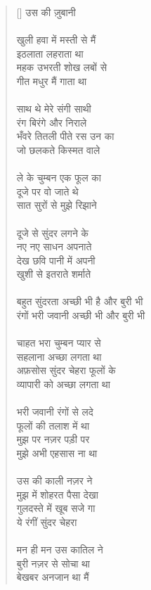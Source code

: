 \begin{verse}[\versewidth]\texthindi{
उस की ज़ुबानी\\
\\
खुली हवा में मस्ती से मैं \\
इठलाता लहराता था\\
महक उभरती शोख लबों से \\
गीत मधुर मैं गाता था\\
\\
साथ थे मेरे संगी साथी \\
रंग बिरंगे और निराले\\
भँवरे तितली पीते रस उन का \\
जो छलकते किस्मत वाले\\
\\
ले के चुम्बन एक फूल का\\
 दूजे पर वो जाते थे\\
सात सुरों से मुझे रिझाने \\
\\
दूजे से सुंदर लगने के \\
नए नए साधन अपनाते\\
देख छवि पानी में अपनी \\
खुशी से इतराते शर्माते\\
\\
बहुत सुंदरता अच्छी भी है और बुरी भी\\
रंगों भरी जवानी अच्छी भी और बुरी भी\\
\\
चाहत भरा चुम्बन प्यार से \\
सहलाना अच्छा लगता था\\
अफ़सोस सुंदर चेहरा फूलों के \\
व्यापारी को अच्छा लगता था\\
\\
भरी जवानी रंगों से लदे \\
फूलों की तलाश में था\\
मुझ पर नज़र पड़ी पर \\
मुझे अभी एहसास ना था\\
\\
उस की काली नज़र ने \\
मुझ में शोहरत पैसा देखा\\
गुलदस्ते में खूब सजे गा \\
ये रंगीं सुंदर चेहरा\\
\\
मन ही मन उस कातिल ने \\
बुरी नज़र से सोचा था\\
बेखबर अनजान था मैं \\
}
\end{verse}
